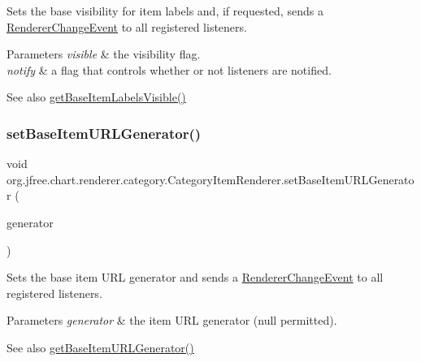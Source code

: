 Sets the base visibility for item labels and, if requested, sends a \mbox{\hyperlink{}{Renderer\+Change\+Event}} to all registered listeners.


\begin{DoxyParams}{Parameters}
{\em visible} & the visibility flag. \\
\hline
{\em notify} & a flag that controls whether or not listeners are notified.\\
\hline
\end{DoxyParams}
\begin{DoxySeeAlso}{See also}
\mbox{\hyperlink{interfaceorg_1_1jfree_1_1chart_1_1renderer_1_1category_1_1_category_item_renderer_a2d90e661b0f4c361b2f378293310a3e6}{get\+Base\+Item\+Labels\+Visible()}} 
\end{DoxySeeAlso}
\mbox{\label{interfaceorg_1_1jfree_1_1chart_1_1renderer_1_1category_1_1_category_item_renderer_a4400119df0df9fa629f6b0b630da4bb5}} 
\subsubsection{\texorpdfstring{set\+Base\+Item\+U\+R\+L\+Generator()}{setBaseItemURLGenerator()}}
{\footnotesize\ttfamily void org.\+jfree.\+chart.\+renderer.\+category.\+Category\+Item\+Renderer.\+set\+Base\+Item\+U\+R\+L\+Generator (\begin{DoxyParamCaption}\item[{\mbox{\hyperlink{interfaceorg_1_1jfree_1_1chart_1_1urls_1_1_category_u_r_l_generator}{Category\+U\+R\+L\+Generator}}}]{generator }\end{DoxyParamCaption})}

Sets the base item U\+RL generator and sends a \mbox{\hyperlink{}{Renderer\+Change\+Event}} to all registered listeners.


\begin{DoxyParams}{Parameters}
{\em generator} & the item U\+RL generator ({\ttfamily null} permitted).\\
\hline
\end{DoxyParams}
\begin{DoxySeeAlso}{See also}
\mbox{\hyperlink{interfaceorg_1_1jfree_1_1chart_1_1renderer_1_1category_1_1_category_item_renderer_a87008cf9d5718483e89d13b93521d1c2}{get\+Base\+Item\+U\+R\+L\+Generator()}} 
\end{DoxySeeAlso}


